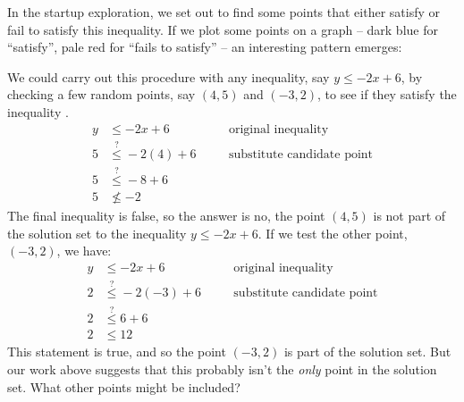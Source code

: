 In the startup exploration, we set out to find some points that either satisfy or fail to satisfy this inequality. If we plot some points on a graph -- dark blue for ``satisfy'', pale red for ``fails to satisfy'' -- an interesting pattern emerges:

\begin{figure}
\end{figure}

We could carry out this procedure with any inequality, say $y \leq -2x + 6$, by checking a few random points, say $(4,5)$ and $(-3,2)$, to see if they satisfy the inequality .
\[\begin{aligned}
y &\leq -2x+6
&& \quad\text{original inequality}\\
5 &\overset{?}{\leq} -2(4)+6
&& \quad\text{substitute candidate point}\\
5 &\overset{?}{\leq} -8+6
\\
5 &\nleq -2
\end{aligned}\]
The final inequality is false, so the answer is no, the point $(4,5)$ is not part of the solution set to the inequality $y \leq -2x + 6$. If we test the other point, $(-3,2)$, we have:
\[\begin{aligned}
y &\leq -2x+6
&& \quad\text{original inequality}\\
2 &\overset{?}{\leq} -2(-3)+6
&& \quad\text{substitute candidate point}\\
2 &\overset{?}{\leq} 6+6
\\
2 &\leq 12
\end{aligned}\]
This statement is true, and so the point $(-3,2)$ is part of the solution set. But our work above suggests that this probably isn't the \textit{only} point in the solution set. What other points might be included?


